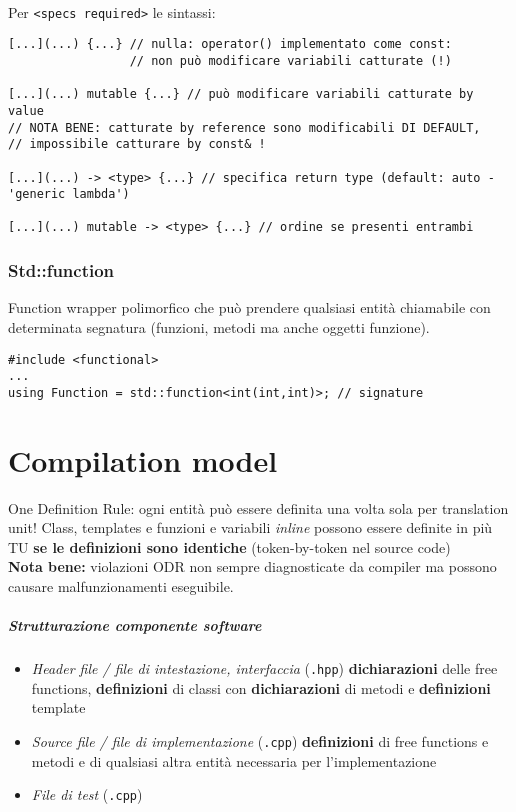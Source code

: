 \documentclass[10pt, oneside]{Book}
\begin{document}
\\Per \texttt{<specs required>} le sintassi:
\begin{verbatim}
[...](...) {...} // nulla: operator() implementato come const: 
                 // non può modificare variabili catturate (!)

[...](...) mutable {...} // può modificare variabili catturate by value
// NOTA BENE: catturate by reference sono modificabili DI DEFAULT,
// impossibile catturare by const& !

[...](...) -> <type> {...} // specifica return type (default: auto - 'generic lambda')

[...](...) mutable -> <type> {...} // ordine se presenti entrambi
\end{verbatim}

\subsection{Std::function}
Function wrapper polimorfico che può prendere qualsiasi entità chiamabile con determinata segnatura (funzioni, metodi ma anche oggetti funzione).
\begin{verbatim}
#include <functional>
...
using Function = std::function<int(int,int)>; // signature
\end{verbatim}

\chapter{Compilation model}
One Definition Rule: ogni entità può essere definita una volta sola per translation unit! Class, templates e funzioni e variabili \textit{inline} possono essere definite in più TU \textbf{se le definizioni sono identiche} (token-by-token nel source code)
\\\textbf{Nota bene:} violazioni ODR non sempre diagnosticate da compiler ma possono causare malfunzionamenti eseguibile.
\\\paragraph{Strutturazione componente software}
\begin{itemize}
\item \textit{Header file / file di intestazione, interfaccia} (\texttt{.hpp}) \textbf{dichiarazioni} delle free functions, \textbf{definizioni} di classi con \textbf{dichiarazioni} di metodi e \textbf{definizioni }template
\item \textit{Source file / file di implementazione} (\texttt{.cpp}) \textbf{definizioni} di free functions e metodi e di qualsiasi altra entità necessaria per l'implementazione 
\item \textit{File di test} (\texttt{.cpp})
\end{itemize}
\end{document}
